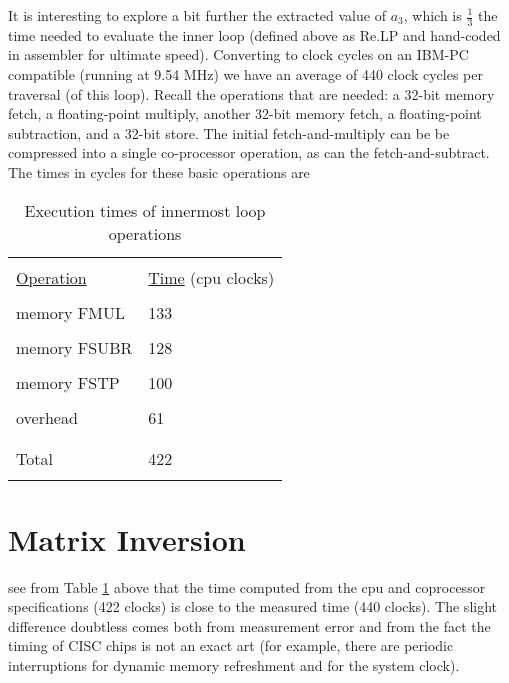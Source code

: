 It is interesting to explore a bit further the extracted value of $a_3$,
which is $\frac{1}{3}$ the time needed to evaluate the inner loop (defined
above as Re.LP and hand-coded in assembler for ultimate
speed). Converting to clock cycles on an IBM-PC compatible
(running at 9.54 MHz) we have an average of 440 clock cycles per
traversal (of this loop). Recall the operations that are needed: a
32-bit memory fetch, a floating-point multiply, another 32-bit
memory fetch, a floating-point subtraction, and a 32-bit store.
The initial fetch-and-multiply can be be compressed into a single
co-processor operation, as can the fetch-and-subtract. The times
in cycles for these basic operations are
\begin{table}
    \centering
    \caption{Execution times of innermost loop operations}
        \bigskip
    \label{tbl:09_02} 
    \setlength{\tabcolsep}{10pt}
        \begin{tabular}{|ll|}
            \hline &  \\
            \underline{Operation} & \underline{Time} \; (cpu clocks)\\
            &  \\
            memory FMUL &  133  \\
            &  \\
            memory FSUBR &  128  \\
            &  \\
            memory FSTP &  100  \\ 
            &  \\
            overhead &  61  \\ 
            &  \\
            \hline &  \\
            Total &  422  \\ 
            &  \\
            \hline
        \end{tabular}
\end{table}
 

\section{Matrix Inversion}
 see from Table \ref{tbl:09_02} above that the time computed from the
cpu and coprocessor specifications (422 clocks) is close to the
measured time (440 clocks). The slight difference doubtless
comes both from measurement error and from the fact the
timing of CISC chips is not an exact art (for example, there are
periodic interruptions for dynamic memory refreshment and for
the system clock).

